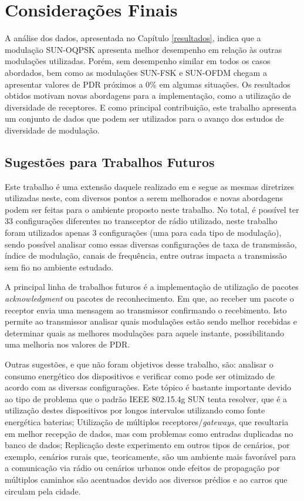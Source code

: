 \chapter{Considerações Finais}
\label{cap:conclusao}
A análise dos dados, apresentada no Capítulo \ref{resultados}, indica que a modulação SUN-OQPSK apresenta melhor desempenho em relação às outras modulações utilizadas. Porém, sem desempenho similar em todos os casos abordados, bem como as modulações SUN-FSK e SUN-OFDM chegam a apresentar valores de PDR próximos a 0\% em algumas situações. Os resultados obtidos motivam novas abordagens para a implementação, como a utilização de diversidade de receptores. E como principal contribuição, este trabalho apresenta um conjunto de dados que podem ser utilizados para o avanço dos estudos de diversidade de modulação.

\section{Sugestões para Trabalhos Futuros}
\label{sec:futuros}
Este trabalho é uma extensão daquele realizado em \cite{tuset2020dataset} e segue as mesmas diretrizes utilizadas neste, com diversos pontos a serem melhorados e novas abordagens podem ser feitas para o ambiente proposto neste trabalho. No total, é possível ter 33 configurações diferentes no transceptor de rádio utilizado, neste trabalho foram utilizados apenas 3 configurações (uma para cada tipo de modulação), sendo possível analisar como essas diversas configurações de taxa de transmissão, índice de modulação, canais de frequência, entre outras impacta a transmissão sem fio no ambiente estudado.

A principal linha de trabalhos futuros é a implementação de utilização de pacotes \emph{acknowledgment} ou pacotes de reconhecimento. Em que, ao receber um pacote o receptor envia uma mensagem ao transmissor confirmando o recebimento. Isto permite ao transmissor analisar quais modulações estão sendo melhor recebidas e determinar quais as melhores modulações para aquele instante, possibilitando uma melhoria nos valores de PDR.

Outras sugestões, e que não foram objetivos desse trabalho, são: analisar o consumo energético dos dispositivos e verificar como pode ser otimizado de acordo com as diversas configurações. Este tópico é bastante importante devido ao tipo de problema que o padrão IEEE 802.15.4g SUN tenta resolver, que é a utilização destes dispositivos por longos intervalos utilizando como fonte energética baterias; Utilização de múltiplos receptores/\emph{gateways}, que resultaria em melhor recepção de dados, mas com problemas como entradas duplicadas no banco de dados; Replicação deste experimento em outros tipos de cenários, por exemplo, cenários rurais que, teoricamente, são um ambiente mais favorável para a comunicação via rádio ou cenários urbanos onde efeitos de propagação por múltiplos caminhos são acentuados devido aos diversos prédios e ao carros que circulam pela cidade.
